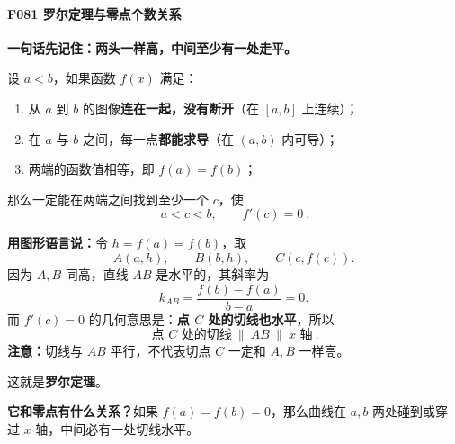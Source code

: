 \begin{statementbox}
\par\medskip
\noindent\begin{minipage}{\linewidth}
\paragraph{F081 罗尔定理与零点个数关系}
\begin{center}\end{center}
\end{minipage}\par\medskip
\textbf{一句话先记住：两头一样高，中间至少有一处走平。}

设 $a<b$，如果函数 $f(x)$ 满足：
\begin{enumerate}
  \item 从 $a$ 到 $b$ 的图像\textbf{连在一起，没有断开}（在 $[a,b]$ 上连续）；
  \item 在 $a$ 与 $b$ 之间，每一点\textbf{都能求导}（在 $(a,b)$ 内可导）；
  \item 两端的函数值相等，即 $f(a)=f(b)$；
\end{enumerate}
那么一定能在两端之间找到至少一个 $c$，使
\[
\boxed{\ a<c<b,\qquad f'(c)=0\ }.
\]

\textbf{用图形语言说：}令 $h=f(a)=f(b)$，取
\[
A(a,h),\qquad B(b,h),\qquad C(c,f(c)).
\]
因为 $A,B$ 同高，直线 $AB$ 是水平的，其斜率为
\[
 k_{AB}=\frac{f(b)-f(a)}{b-a}=0.
\]
而 $f'(c)=0$ 的几何意思是：\textbf{点 $C$ 处的切线也水平}，所以
\[
\boxed{\ \text{点 }C\text{ 处的切线}\ \parallel\ AB\ \parallel\ x\text{ 轴}\ }.
\]
\textbf{注意：}切线与 $AB$ 平行，不代表切点 $C$ 一定和 $A,B$ 一样高。

这就是\textbf{罗尔定理}。

\textbf{它和零点有什么关系？}如果 $f(a)=f(b)=0$，那么曲线在 $a,b$ 两处碰到或穿过 $x$ 轴，中间必有一处切线水平。
\end{statementbox}
\clearpage
